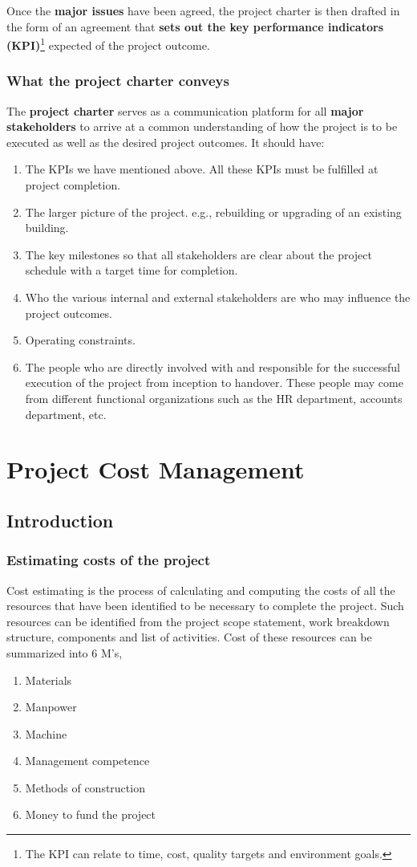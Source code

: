 \documentclass[math,code]{amznotes}
\theoremstyle{remark}
\begin{document}
Once the \textbf{major issues} have been agreed, the project charter is then drafted in the form of an agreement that \textbf{sets out the key performance indicators (KPI)}\footnote{The KPI can relate to time, cost, quality targets and environment goals.} expected of the project outcome.
\subsection{What the project charter conveys}
The \textbf{project charter} serves as a communication platform for all \textbf{major stakeholders} to arrive at a common understanding of how the project is to be executed as well as the desired project outcomes. It should have:
\begin{enumerate}
    \item The KPIs we have mentioned above. All these KPIs must be fulfilled at project completion.
    \item The larger picture of the project. e.g., rebuilding or upgrading of an existing building.
    \item The key milestones so that all stakeholders are clear about the project schedule with a target time for completion.
    \item Who the various internal and external stakeholders are who may influence the project outcomes.
    \item Operating constraints.
    \item The people who are directly involved with and responsible for the successful execution of the project from inception to handover. These people may come from different functional organizations such as the HR department, accounts department, etc.
\end{enumerate}

\chapter{Project Cost Management}
\section{Introduction}
\subsection{Estimating costs of the project}
Cost estimating is the process of calculating and computing the costs of all the resources that have been identified to be necessary to complete the project. Such resources can be identified from the project scope statement, work breakdown structure, components and list of activities. Cost of these resources can be summarized into 6 M's,
\begin{enumerate}
    \item Materials
    \item Manpower
    \item Machine
    \item Management competence
    \item Methods of construction
    \item Money to fund the project
\end{enumerate}
\end{document}
